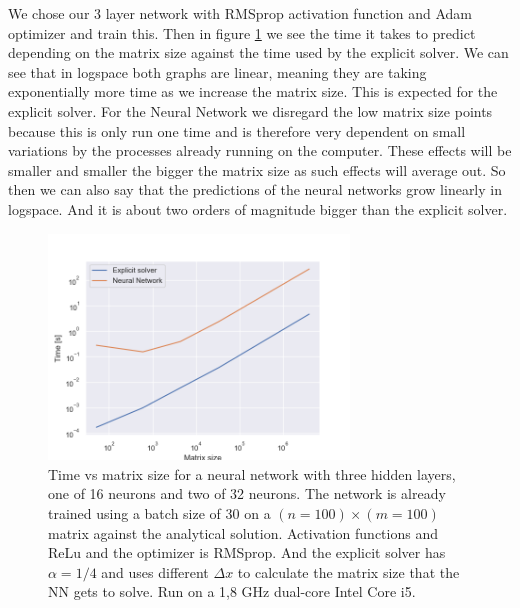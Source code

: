 We chose our 3 layer network with RMSprop activation function and Adam
optimizer and train this. Then in figure \ref{fig:time_vs_size} we see the time it takes to
predict depending on the matrix size against the time used by the explicit
solver. We can see that in logspace both graphs are linear, meaning they are
taking exponentially more time as we increase the matrix size. This is
expected for the explicit solver. For the Neural Network we disregard the low
matrix size points because this is only run one time and is therefore very
dependent on small variations by the processes already running on the computer.
These effects will be smaller and smaller the bigger the matrix size as such
effects will average out. So then we can also say that the predictions of the
neural networks grow linearly in logspace. And it is about two orders of
magnitude bigger than the explicit solver.

\begin{figure}[h!]
    \centering
    \includegraphics[width=8cm]{../Figures/time_vs_matrix_size.png}
    \caption{Time vs matrix size for a neural network with three hidden layers,
    one of 16 neurons and two of 32 neurons. The network is already trained
    using a batch size of 30 on a $(n=100)\times
    (m=100)$ matrix against the analytical solution. Activation functions and
    ReLu and the optimizer is RMSprop. And the explicit solver has $\alpha=1/4$
    and uses different $\Delta x$ to calculate the matrix size that the NN gets
    to solve. Run on a 1,8 GHz dual-core Intel Core i5.}
    \label{fig:time_vs_size}
\end{figure}

